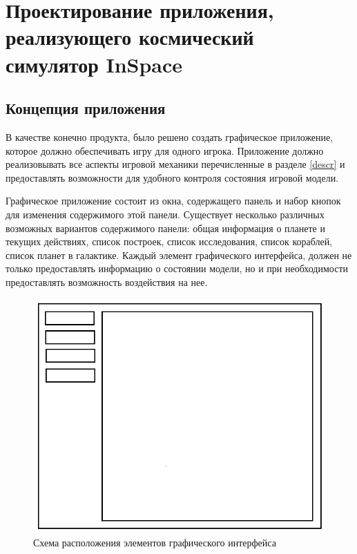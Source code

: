 \section{Проектирование приложения, реализующего космический симулятор InSpace}

\subsection{Концепция приложения} 

В качестве конечно продукта, было решено создать графическое приложение, которое должно обеспечивать игру для одного игрока. Приложение должно реализовывать все аспекты игровой механики перечисленные в разделе \ref{descr} и предоставлять возможности для удобного контроля состояния игровой модели. 

Графическое приложение состоит из окна, содержащего панель и набор кнопок для изменения содержимого этой панели. Существует несколько различных возможных вариантов содержимого панели: общая информация о планете и текущих действиях, список построек, список исследования, список кораблей, список планет в галактике. Каждый элемент графического интерфейса, должен не только предоставлять информацию о состоянии модели, но и при необходимости предоставлять возможность воздействия на нее.

\begin{figure}[H]
\centering
\includegraphics[scale=0.5]{sc.jpg}
\caption{Схема расположения элементов графического интерфейса}
\label{sc}
\end{figure}

